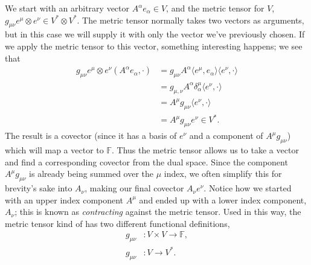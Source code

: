 We start with an arbitrary vector $A^\alpha e_\alpha \in V$, and the metric tensor for $V$, $g_{\mu\nu} e^\mu \otimes e^\nu \in V^* \otimes V^*$.
The metric tensor normally takes two vectors as arguments, but in this case we will supply it with only the vector we've previously chosen.
If we apply the metric tensor to this vector, something interesting happens; we see that
\begin{align}
    g_{\mu\nu} e^\mu \otimes e^\nu (A^\alpha e_\alpha, \cdot) &=
    g_{\mu\nu} A^\alpha \langle e^\mu, e_\alpha \rangle \langle e^\nu, \cdot \rangle\label{eqn:metric-index-lowering} \\
    &= g_{\mu, \nu} A^\alpha \delta^\mu_\alpha \langle e^\nu, \cdot \rangle \nonumber \\
    &= A^\mu g_{\mu\nu} \langle e^\nu, \cdot \rangle \nonumber \\
    &= A^\mu g_{\mu\nu} e^\nu \in V^* \nonumber.
\end{align}
The result is a covector (since it has a basis of $e^\nu$ and a component of $A^\mu g_{\mu\nu}$) which will map a vector to $\mathbb{F}$.
Thus the metric tensor allows us to take a vector and find a corresponding covector from the dual space.
Since the component $A^\mu g_{\mu\nu}$ is already being summed over the $\mu$ index, we often simplify this for brevity's sake into $A_\nu$, making our final covector $A_\nu e^\nu$. 
Notice how we started with an upper index component $A^\mu$ and ended up with a lower index component, $A_\nu$; this is known as \emph{contracting} against the metric tensor.
Used in this way, the metric tensor kind of has two different functional definitions,
\begin{align*}
    g_{\mu\nu} &: V \times V \to \mathbb{F}, \\
    g_{\mu\nu} &: V \to V^*.
\end{align*}
